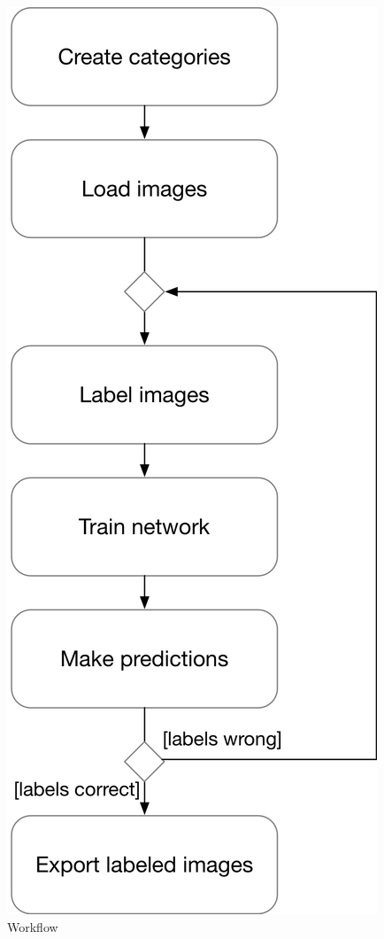 \begin{figure}[H]
	\centering
	\includegraphics[scale=0.6]{bilder/cyto/Ablaufdiagramm.png}
	\caption{Workflow}
	\label{fig:Workflow}
\end{figure}

